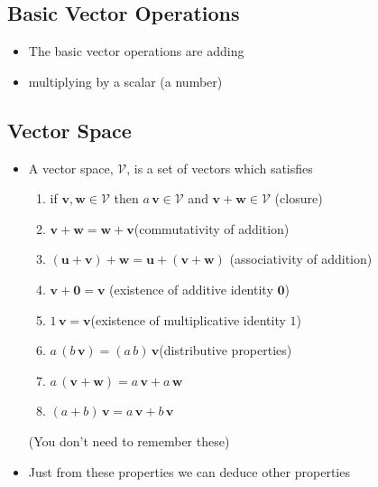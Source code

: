 \begin{slide}
\section[-2]{Basic Vector Operations}

\pb
\begin{itemize}
\item The basic vector operations are adding\pauseh{}
  \begin{center}
    \pause
  \end{center}
\item multiplying by a scalar (a number)\pauseh{}
  \begin{center}
    \pause
  \end{center}
\end{itemize}

\end{slide}


\begin{slide}
\section[-1]{Vector Space}

\begin{PauseHighLight}
  \begin{itemize}
  \item A vector space, $\mathcal{V}$, is a set of vectors which satisfies
    \begin{enumerate}\squeeze
    \item if $\bm{v}, \bm{w}\in\mathcal{V}$ then
      $a\,\bm{v}\in\mathcal{V}$ and $\bm{v}+\bm{w}\in\mathcal{V}$\hfill
      (closure)\pause 
    \item $\bm{v} + \bm{w} = \bm{w} + \bm{v}$\hfill (commutativity of
      addition)\pause 
    \item $(\bm{u}+\bm{v}) + \bm{w} = \bm{u} + (\bm{v} + \bm{w})$\hfill
      (associativity of addition)\pause
    \item $\bm{v} + \bm{0} = \bm{v}$ \hfill(existence of additive identity
      $\bm{0}$)\pause 
    \item $1 \, \bm{v} = \bm{v}$\hfill (existence of multiplicative identity
      $1$)\pause
    \item $a\,(b\,\bm{v}) = (a\,b)\,\bm{v}$\hfill (distributive properties)
    \item $a\,(\bm{v} + \bm{w}) = a\,\bm{v} + a\,\bm{w}$
    \item $(a+b)\,\bm{v} = a\,\bm{v} + b\,\bm{v}$\pause
    \end{enumerate}
    (You don't need to remember these)\pause
  \item Just from these properties we can deduce other properties\pause
  \end{itemize}
\end{PauseHighLight}


\end{slide}

